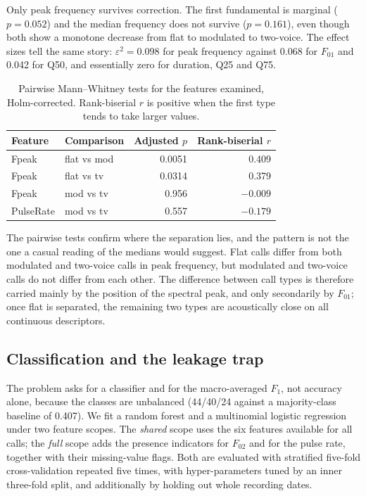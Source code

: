Only peak frequency survives correction. The first fundamental is marginal ($p=0.052$) and the
median frequency does not survive ($p=0.161$), even though both show a monotone decrease from
flat to modulated to two-voice. The effect sizes tell the same story: $\varepsilon^2=0.098$ for
peak frequency against 0.068 for $F_{01}$ and 0.042 for Q50, and essentially zero for duration,
Q25 and Q75.

\begin{table}[htbp]
  \centering
  \caption{Pairwise Mann--Whitney tests for the features examined, Holm-corrected. Rank-biserial
  $r$ is positive when the first type tends to take larger values.}\label{tab:q1-pair}
  \small
  \begin{tabular}{llrr}
    \toprule
    Feature & Comparison & Adjusted $p$ & Rank-biserial $r$ \\
    \midrule
    Fpeak & flat vs mod & 0.0051 & 0.409 \\
    Fpeak & flat vs tv & 0.0314 & 0.379 \\
    Fpeak & mod vs tv & 0.956 & $-0.009$ \\
    PulseRate & mod vs tv & 0.557 & $-0.179$ \\
    \bottomrule
  \end{tabular}
\end{table}

The pairwise tests confirm where the separation lies, and the pattern is not the one a casual
reading of the medians would suggest. Flat
calls differ from both modulated and two-voice calls in peak frequency, but modulated and
two-voice calls do not differ from each other. The difference between call types is therefore
carried mainly by the position of the spectral peak, and only secondarily by $F_{01}$; once flat
is separated, the remaining two types are acoustically close on all continuous descriptors.

\subsection{Classification and the leakage trap}

The problem asks for a classifier and for the macro-averaged $F_1$, not accuracy alone, because
the classes are unbalanced (44/40/24 against a majority-class baseline of 0.407). We fit a random
forest and a multinomial logistic regression under two feature scopes. The \emph{shared} scope
uses the six features available for all calls; the \emph{full} scope adds the presence indicators
for $F_{02}$ and for the pulse rate, together with their missing-value flags. Both are evaluated
with stratified five-fold cross-validation repeated five times, with hyper-parameters tuned by an
inner three-fold split, and additionally by holding out whole recording dates.

